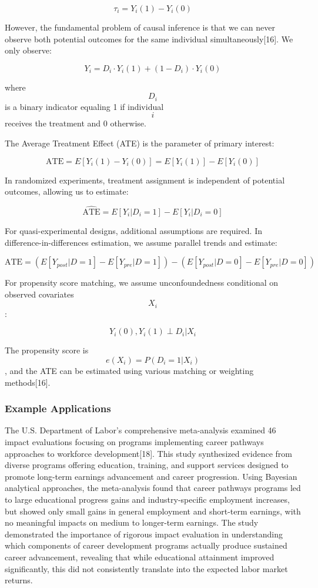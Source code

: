 \documentclass[main.tex]{subfiles}
\begin{document}
$$ \tau_i = Y_i(1) - Y_i(0) $$

However, the fundamental problem of causal inference is that we can never observe both potential outcomes for the same individual simultaneously[16]. We only observe:

$$ Y_i = D_i \cdot Y_i(1) + (1-D_i) \cdot Y_i(0) $$

where $$D_i$$ is a binary indicator equaling 1 if individual $$i$$ receives the treatment and 0 otherwise.

The Average Treatment Effect (ATE) is the parameter of primary interest:

$$ \text{ATE} = E[Y_i(1) - Y_i(0)] = E[Y_i(1)] - E[Y_i(0)] $$

In randomized experiments, treatment assignment is independent of potential outcomes, allowing us to estimate:

$$ \widehat{\text{ATE}} = E[Y_i|D_i=1] - E[Y_i|D_i=0] $$

For quasi-experimental designs, additional assumptions are required. In difference-in-differences estimation, we assume parallel trends and estimate:

$$ \text{ATE} = (E[Y_{post}|D=1] - E[Y_{pre}|D=1]) - (E[Y_{post}|D=0] - E[Y_{pre}|D=0]) $$

For propensity score matching, we assume unconfoundedness conditional on observed covariates $$X_i$$:

$$ Y_i(0), Y_i(1) \perp D_i | X_i $$

The propensity score is $$e(X_i) = P(D_i=1|X_i)$$, and the ATE can be estimated using various matching or weighting methods[16].

\subsubsection{Example Applications}


The U.S. Department of Labor's comprehensive meta-analysis examined 46 impact evaluations focusing on programs implementing career pathways approaches to workforce development[18]. This study synthesized evidence from diverse programs offering education, training, and support services designed to promote long-term earnings advancement and career progression. Using Bayesian analytical approaches, the meta-analysis found that career pathways programs led to large educational progress gains and industry-specific employment increases, but showed only small gains in general employment and short-term earnings, with no meaningful impacts on medium to longer-term earnings. The study demonstrated the importance of rigorous impact evaluation in understanding which components of career development programs actually produce sustained career advancement, revealing that while educational attainment improved significantly, this did not consistently translate into the expected labor market returns.
\end{document}
